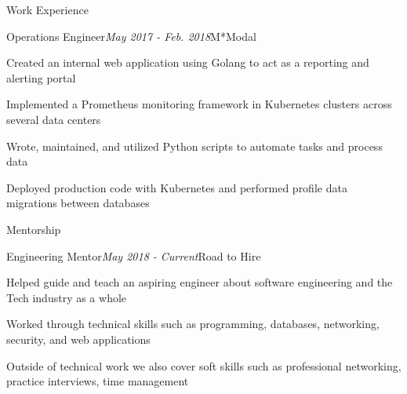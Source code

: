 \documentclass{resume} %
\begin{document}
\begin{rSection}{\vspace{-5pt}Work Experience}
\begin{rSubsection}{Operations Engineer}{\em May 2017 - Feb. 2018}{M*Modal}{}
\item {Created an internal web application using Golang to act as a reporting and alerting portal}
\item {Implemented a Prometheus monitoring framework in Kubernetes clusters across several data centers}
\item {Wrote, maintained, and utilized Python scripts to automate tasks and process data}
\item {Deployed production code with Kubernetes and performed profile data migrations between databases}
\end{rSubsection}

\end{rSection}

\begin{rSection}{\vspace{-5pt}Mentorship}
  \begin{rSubsection}{Engineering Mentor}{\em May 2018 - Current}{Road to Hire}{}
  \item {Helped guide and teach an aspiring engineer about software engineering and the Tech industry as a whole}
  \item {Worked through technical skills such as programming, databases, networking, security, and web applications}
  \item {Outside of technical work we also cover soft skills such as professional networking, practice interviews, time management}
  \end{rSubsection}

\end{rSection}
\end{document}

